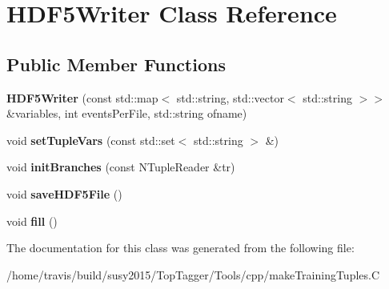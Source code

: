 \hypertarget{classHDF5Writer}{\section{H\-D\-F5\-Writer Class Reference}
\label{classHDF5Writer}
}
\subsection*{Public Member Functions}
\begin{DoxyCompactItemize}
\item 
\hypertarget{classHDF5Writer_a4ae6d6464169c20b942c9f35a375aa6b}{{\bfseries H\-D\-F5\-Writer} (const std\-::map$<$ std\-::string, std\-::vector$<$ std\-::string $>$$>$ \&variables, int events\-Per\-File, std\-::string ofname)}\label{classHDF5Writer_a4ae6d6464169c20b942c9f35a375aa6b}

\item 
\hypertarget{classHDF5Writer_a636afc5a3f1d26c84eec5975e200418d}{void {\bfseries set\-Tuple\-Vars} (const std\-::set$<$ std\-::string $>$ \&)}\label{classHDF5Writer_a636afc5a3f1d26c84eec5975e200418d}

\item 
\hypertarget{classHDF5Writer_af0e59c14065285d91bc8e5dad4bfd7f9}{void {\bfseries init\-Branches} (const N\-Tuple\-Reader \&tr)}\label{classHDF5Writer_af0e59c14065285d91bc8e5dad4bfd7f9}

\item 
\hypertarget{classHDF5Writer_adbd14eba2d2d401d635ba6cbce691afe}{void {\bfseries save\-H\-D\-F5\-File} ()}\label{classHDF5Writer_adbd14eba2d2d401d635ba6cbce691afe}

\item 
\hypertarget{classHDF5Writer_af88c6deb22f565aa60a27dc5476a59e7}{void {\bfseries fill} ()}\label{classHDF5Writer_af88c6deb22f565aa60a27dc5476a59e7}

\end{DoxyCompactItemize}


The documentation for this class was generated from the following file\-:\begin{DoxyCompactItemize}
\item 
/home/travis/build/susy2015/\-Top\-Tagger/\-Tools/cpp/make\-Training\-Tuples.\-C\end{DoxyCompactItemize}
